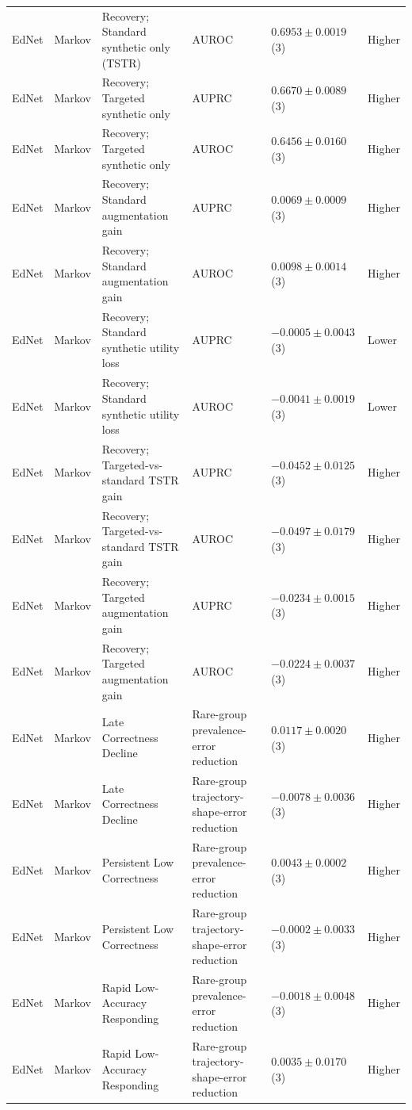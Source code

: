 \begin{longtable}{@{}p{2.25cm}p{2.05cm}p{4.7cm}p{5.0cm}p{2.6cm}p{1.25cm}@{}}
EdNet & Markov & Recovery; Standard synthetic only (TSTR) & AUROC & $0.6953 \mathbin{\pm} 0.0019$ (3) & Higher \\
EdNet & Markov & Recovery; Targeted synthetic only & AUPRC & $0.6670 \mathbin{\pm} 0.0089$ (3) & Higher \\
EdNet & Markov & Recovery; Targeted synthetic only & AUROC & $0.6456 \mathbin{\pm} 0.0160$ (3) & Higher \\
EdNet & Markov & Recovery; Standard augmentation gain & AUPRC & $0.0069 \mathbin{\pm} 0.0009$ (3) & Higher \\
EdNet & Markov & Recovery; Standard augmentation gain & AUROC & $0.0098 \mathbin{\pm} 0.0014$ (3) & Higher \\
EdNet & Markov & Recovery; Standard synthetic utility loss & AUPRC & $-0.0005 \mathbin{\pm} 0.0043$ (3) & Lower \\
EdNet & Markov & Recovery; Standard synthetic utility loss & AUROC & $-0.0041 \mathbin{\pm} 0.0019$ (3) & Lower \\
EdNet & Markov & Recovery; Targeted-vs-standard TSTR gain & AUPRC & $-0.0452 \mathbin{\pm} 0.0125$ (3) & Higher \\
EdNet & Markov & Recovery; Targeted-vs-standard TSTR gain & AUROC & $-0.0497 \mathbin{\pm} 0.0179$ (3) & Higher \\
EdNet & Markov & Recovery; Targeted augmentation gain & AUPRC & $-0.0234 \mathbin{\pm} 0.0015$ (3) & Higher \\
EdNet & Markov & Recovery; Targeted augmentation gain & AUROC & $-0.0224 \mathbin{\pm} 0.0037$ (3) & Higher \\
EdNet & Markov & Late Correctness Decline & Rare-group prevalence-error reduction & $0.0117 \mathbin{\pm} 0.0020$ (3) & Higher \\
EdNet & Markov & Late Correctness Decline & Rare-group trajectory-shape-error reduction & $-0.0078 \mathbin{\pm} 0.0036$ (3) & Higher \\
EdNet & Markov & Persistent Low Correctness & Rare-group prevalence-error reduction & $0.0043 \mathbin{\pm} 0.0002$ (3) & Higher \\
EdNet & Markov & Persistent Low Correctness & Rare-group trajectory-shape-error reduction & $-0.0002 \mathbin{\pm} 0.0033$ (3) & Higher \\
EdNet & Markov & Rapid Low-Accuracy Responding & Rare-group prevalence-error reduction & $-0.0018 \mathbin{\pm} 0.0048$ (3) & Higher \\
EdNet & Markov & Rapid Low-Accuracy Responding & Rare-group trajectory-shape-error reduction & $0.0035 \mathbin{\pm} 0.0170$ (3) & Higher \\

\end{longtable}
